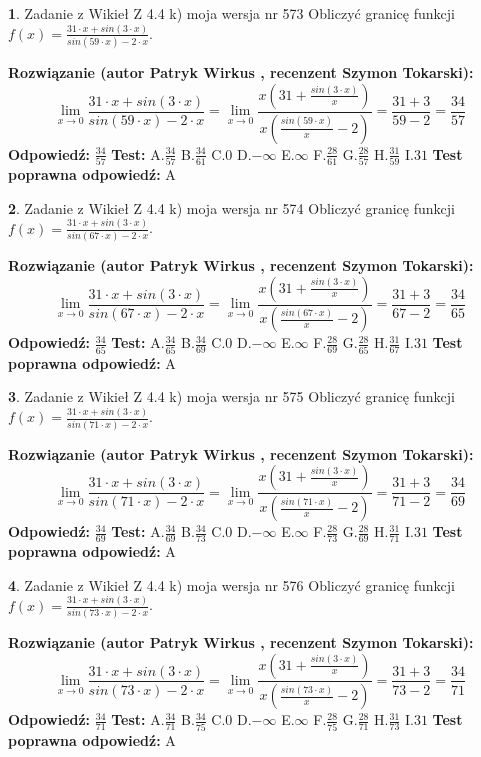 \documentclass[12pt, a4paper]{article}
\theoremstyle{definition} %
\newtheorem{zad}{}
\newcommand{\zadStart}[1]{\begin{zad}#1\newline}
\newcommand{\zadStop}{\end{zad}}
\newcommand{\rozwStart}[2]{\noindent \textbf{Rozwiązanie (autor #1 , recenzent #2): }\newline}
\newcommand{\rozwStop}{\newline}
\newcommand{\odpStart}{\noindent \textbf{Odpowiedź:}\newline}
\newcommand{\odpStop}{\newline}
\newcommand{\testStart}{\noindent \textbf{Test:}\newline}
\newcommand{\testStop}{\newline}
\newcommand{\kluczStart}{\noindent \textbf{Test poprawna odpowiedź:}\newline}
\newcommand{\kluczStop}{\newline}
\begin{document}
\zadStart{Zadanie z Wikieł Z 4.4 k) moja wersja nr 573}
Obliczyć granicę funkcji $f(x)=\frac{31\cdot x +sin(3\cdot x)}{sin(59\cdot x) -2\cdot x}$.
\zadStop
\rozwStart{Patryk Wirkus}{Szymon Tokarski}
$$\lim\limits_{x\to 0}\frac{31\cdot x +sin(3\cdot x)}{sin(59\cdot x) -2\cdot x}
=\lim\limits_{x\to 0}\frac{x(31+\frac{sin(3\cdot x)}{x})}{x(\frac{sin(59\cdot x)}{x}-2)}
=\frac{31+3}{59-2} = \frac{34}{57}$$
\rozwStop
\odpStart
$\frac{34}{57}$
\odpStop
\testStart
A.$\frac{34}{57}$
B.$\frac{34}{61}$
C.$0$
D.$-\infty$
E.$\infty$
F.$\frac{28}{61}$
G.$\frac{28}{57}$
H.$\frac{31}{59}$
I.$31$
\testStop
\kluczStart
A
\kluczStop



\zadStart{Zadanie z Wikieł Z 4.4 k) moja wersja nr 574}
Obliczyć granicę funkcji $f(x)=\frac{31\cdot x +sin(3\cdot x)}{sin(67\cdot x) -2\cdot x}$.
\zadStop
\rozwStart{Patryk Wirkus}{Szymon Tokarski}
$$\lim\limits_{x\to 0}\frac{31\cdot x +sin(3\cdot x)}{sin(67\cdot x) -2\cdot x}
=\lim\limits_{x\to 0}\frac{x(31+\frac{sin(3\cdot x)}{x})}{x(\frac{sin(67\cdot x)}{x}-2)}
=\frac{31+3}{67-2} = \frac{34}{65}$$
\rozwStop
\odpStart
$\frac{34}{65}$
\odpStop
\testStart
A.$\frac{34}{65}$
B.$\frac{34}{69}$
C.$0$
D.$-\infty$
E.$\infty$
F.$\frac{28}{69}$
G.$\frac{28}{65}$
H.$\frac{31}{67}$
I.$31$
\testStop
\kluczStart
A
\kluczStop



\zadStart{Zadanie z Wikieł Z 4.4 k) moja wersja nr 575}
Obliczyć granicę funkcji $f(x)=\frac{31\cdot x +sin(3\cdot x)}{sin(71\cdot x) -2\cdot x}$.
\zadStop
\rozwStart{Patryk Wirkus}{Szymon Tokarski}
$$\lim\limits_{x\to 0}\frac{31\cdot x +sin(3\cdot x)}{sin(71\cdot x) -2\cdot x}
=\lim\limits_{x\to 0}\frac{x(31+\frac{sin(3\cdot x)}{x})}{x(\frac{sin(71\cdot x)}{x}-2)}
=\frac{31+3}{71-2} = \frac{34}{69}$$
\rozwStop
\odpStart
$\frac{34}{69}$
\odpStop
\testStart
A.$\frac{34}{69}$
B.$\frac{34}{73}$
C.$0$
D.$-\infty$
E.$\infty$
F.$\frac{28}{73}$
G.$\frac{28}{69}$
H.$\frac{31}{71}$
I.$31$
\testStop
\kluczStart
A
\kluczStop



\zadStart{Zadanie z Wikieł Z 4.4 k) moja wersja nr 576}
Obliczyć granicę funkcji $f(x)=\frac{31\cdot x +sin(3\cdot x)}{sin(73\cdot x) -2\cdot x}$.
\zadStop
\rozwStart{Patryk Wirkus}{Szymon Tokarski}
$$\lim\limits_{x\to 0}\frac{31\cdot x +sin(3\cdot x)}{sin(73\cdot x) -2\cdot x}
=\lim\limits_{x\to 0}\frac{x(31+\frac{sin(3\cdot x)}{x})}{x(\frac{sin(73\cdot x)}{x}-2)}
=\frac{31+3}{73-2} = \frac{34}{71}$$
\rozwStop
\odpStart
$\frac{34}{71}$
\odpStop
\testStart
A.$\frac{34}{71}$
B.$\frac{34}{75}$
C.$0$
D.$-\infty$
E.$\infty$
F.$\frac{28}{75}$
G.$\frac{28}{71}$
H.$\frac{31}{73}$
I.$31$
\testStop
\kluczStart
A
\kluczStop
\end{document}
